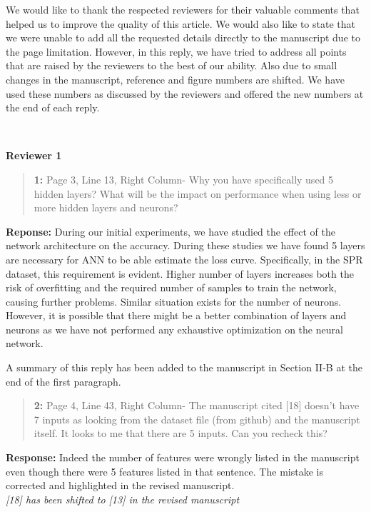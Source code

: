\documentclass{article}
\begin{document}
	
	We would like to thank the respected reviewers for their valuable comments that helped us to improve the quality of this article. We would also like to state that we were unable to add all the requested details directly to the manuscript due to the page limitation. However, in this reply, we have tried to address all points that are raised by the reviewers to the best of our ability. Also due to small changes in the manuscript, reference and figure numbers are shifted. We have used these numbers as discussed by the reviewers and offered the new numbers at the end of each reply.
	
	~
	
	{\bfseries\large Reviewer 1}
	
	\begin{quote}
		\textbf{1: }Page 3, Line 13, Right Column- Why you have specifically used 5 hidden layers? What will be the impact on performance when using less or more hidden layers and neurons?
	\end{quote}
	
	\textbf{Reponse: }During our initial experiments, we have studied the effect of the network architecture on the accuracy. During these studies we have found 5 layers are necessary for ANN to be able estimate the loss curve. Specifically, in the SPR dataset, this requirement is evident. Higher number of layers increases both the risk of overfitting and the required number of samples to train the network, causing further problems. Similar situation exists for the number of neurons. However, it is possible that there might be a better combination of layers and neurons as we have not performed any exhaustive optimization on the neural network.
	
	A summary of this reply has been added to the manuscript in Section II-B at the end of the first paragraph.
	
	\begin{quote}
		\textbf{2: }Page 4, Line 43, Right Column- The manuscript cited [18] doesn't have 7 inputs as looking from the dataset file (from github) and the manuscript itself. It looks to me that there are 5 inputs. Can you recheck this?
	\end{quote}
	
	\textbf{Response:} Indeed the number of features were wrongly listed in the manuscript even though there were 5 features listed in that sentence. The mistake is corrected and highlighted in the revised manuscript. \\
	\textit{[18] has been shifted to [13] in the revised manuscript}
	
\end{document}
